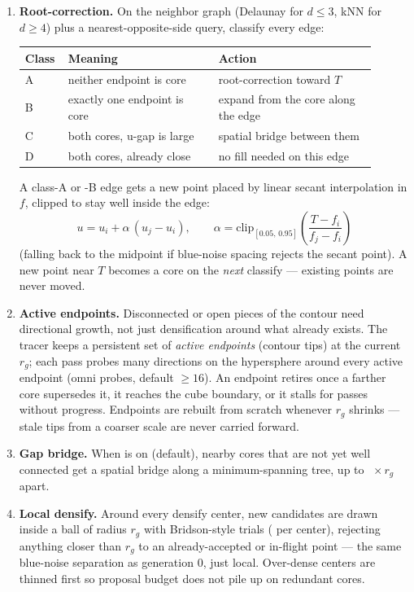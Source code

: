 \begin{enumerate}
  \item \textbf{Root-correction.} On the neighbor graph (Delaunay for $d\le3$, kNN for
        $d\ge4$) plus a nearest-opposite-side query, classify every edge:
        \begin{center}
        \begin{tabular}{@{}p{0.08\linewidth}p{0.40\linewidth}p{0.42\linewidth}@{}}
          \toprule
          \textbf{Class} & \textbf{Meaning} & \textbf{Action} \\
          \midrule
          A & neither endpoint is core & root-correction toward $T$ \\
          B & exactly one endpoint is core & expand from the core along the edge \\
          C & both cores, u-gap is large & spatial bridge between them \\
          D & both cores, already close & no fill needed on this edge \\
          \bottomrule
        \end{tabular}
        \end{center}
        A class-A or -B edge gets a new point placed by linear secant interpolation in
        $f$, clipped to stay well inside the edge:
        \[
        u = u_i + \alpha\,(u_j-u_i), \qquad
        \alpha = \mathrm{clip}_{[0.05,\,0.95]}\!\left(\frac{T-f_i}{f_j-f_i}\right)
        \]
        (falling back to the midpoint if blue-noise spacing rejects the secant point).
        A new point near $T$ becomes a core on the \emph{next} classify --- existing
        points are never moved.
  \item \textbf{Active endpoints.} Disconnected or open pieces of the contour need
        directional growth, not just densification around what already exists. The
        tracer keeps a persistent set of \emph{active endpoints} (contour tips) at the
        current $r_g$; each pass probes many directions on the hypersphere around every
        active endpoint (omni probes, default $\ge16$). An endpoint retires once a
        farther core supersedes it, it reaches the cube boundary, or it stalls for
         passes without progress. Endpoints are rebuilt
        from scratch whenever $r_g$ shrinks --- stale tips from a coarser scale are
        never carried forward.
  \item \textbf{Gap bridge.} When  is on (default), nearby cores
        that are not yet well connected get a spatial bridge along a minimum-spanning
        tree, up to ~$\times\,r_g$ apart.
  \item \textbf{Local densify.} Around every densify center, new candidates are drawn
        inside a ball of radius $r_g$ with Bridson-style trials
        ( per center), rejecting anything closer than $r_g$ to an
        already-accepted or in-flight point --- the same blue-noise separation as
        generation 0, just local. Over-dense centers are thinned first so proposal
        budget does not pile up on redundant cores.
\end{enumerate}

